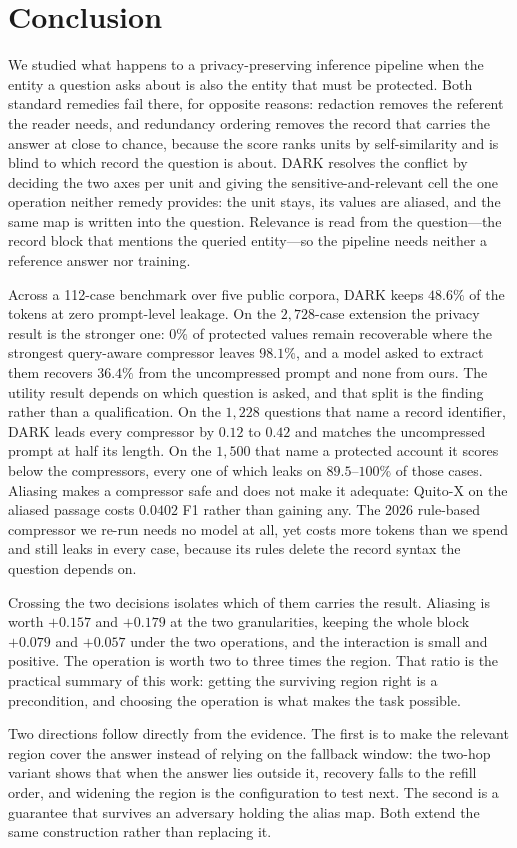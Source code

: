 \section{Conclusion}
\label{sec:conclusion}

We studied what happens to a privacy-preserving inference pipeline when the entity a
question asks about is also the entity that must be protected. Both standard remedies fail
there, for opposite reasons: redaction removes the referent the reader needs, and redundancy
ordering removes the record that carries the answer at close to chance, because the score
ranks units by self-similarity and is blind to which record the question is about.
\textsc{DARK} resolves the conflict by deciding the two axes per unit and giving the
sensitive-and-relevant cell the one operation neither remedy provides: the unit stays, its
values are aliased, and the same map is written into the question. Relevance is read from the
question---the record block that mentions the queried entity---so the pipeline needs neither a
reference answer nor training.

Across a 112-case benchmark over five public corpora, \textsc{DARK} keeps $48.6\%$ of the
tokens at zero prompt-level leakage. On the $2{,}728$-case extension the privacy result is the
stronger one: $0\%$ of protected values remain recoverable where the strongest query-aware
compressor leaves $98.1\%$, and a model asked to extract them recovers $36.4\%$ from the
uncompressed prompt and none from ours. The utility result depends on which question is asked, and that
split is the finding rather than a qualification. On the $1{,}228$ questions that name a record
identifier, \textsc{DARK} leads every compressor by $0.12$ to $0.42$ and matches the uncompressed
prompt at half its length. On the $1{,}500$ that name a protected account it scores below the
compressors, every one of which leaks on $89.5$--$100\%$ of those cases. Aliasing makes a
compressor safe and does not make it adequate: Quito-X on the aliased passage costs $0.0402$ F1
rather than gaining any. The 2026 rule-based compressor we re-run needs no model at all, yet costs
more tokens than we spend and still leaks in every case, because its rules delete the record syntax
the question depends on.

Crossing the two decisions isolates which of them carries the result. Aliasing is worth $+0.157$
and $+0.179$ at the two granularities, keeping the whole block $+0.079$ and $+0.057$ under the two
operations, and the interaction is small and positive. The operation is worth two to three times
the region. That ratio is the practical summary of this work: getting the surviving region right
is a precondition, and choosing the operation is what makes the task possible.

Two directions follow directly from the evidence. The first is to make the relevant region cover
the answer instead of relying on the fallback window: the two-hop variant shows that when the answer
lies outside it, recovery falls to the refill order, and widening the region is the configuration to
test next. The second is a guarantee that survives an adversary holding the alias map. Both extend
the same construction rather than replacing it.
